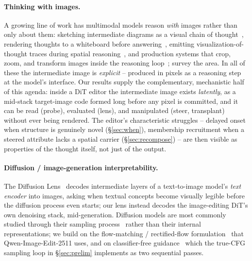 \documentclass[10pt,twocolumn]{article}
\newcommand{\model}{Qwen-Image-Edit-2511}
\begin{document}
\paragraph{Thinking with images.} A growing line of work has multimodal
models reason \emph{with} images rather than only about them: sketching
intermediate diagrams as a visual chain of
thought~\citep{hu2024sketchpad}, rendering thoughts to a whiteboard
before answering~\citep{menon2024whiteboard}, emitting
visualization-of-thought traces during spatial
reasoning~\citep{wu2024vot,li2025mvot}, and production systems that
crop, zoom, and transform images inside the reasoning
loop~\citep{openai2025thinking}; \citet{su2025thinkingsurvey} survey
the area. In all of these the intermediate image is \emph{explicit} --
produced in pixels as a reasoning step at the model's interface. Our
results supply the complementary, mechanistic half of this agenda:
inside a DiT editor the intermediate image exists \emph{latently}, as a
mid-stack target-image code formed long before any pixel is committed,
and it can be read (probe), evaluated (lens), and manipulated (steer,
transplant) without ever being rendered. The editor's characteristic
struggles -- delayed onset when structure is genuinely novel
(\S\ref{sec:when}), membership recruitment when a steered attribute
lacks a spatial carrier (\S\ref{sec:recompose}) -- are then visible as
properties of the thought itself, not just of the output.

\paragraph{Diffusion / image-generation interpretability.} The Diffusion
Lens~\citep{toker2024diffusionlens} decodes intermediate layers of a
text-to-image model's \emph{text encoder} into images, asking when
textual concepts become visually legible before the diffusion process
even starts; our lens instead decodes the image-editing DiT's own
denoising stack, mid-generation. Diffusion models are most commonly
studied through their sampling
process~\citep{ho2020ddpm,song2021ddim,rombach2022ldm} rather than their
internal representations; we build on the flow-matching / rectified-flow
formulation~\citep{lipman2023flowmatching,liu2023rectifiedflow} that
\model{} uses, and on classifier-free
guidance~\citep{ho2022cfg} which the true-CFG sampling loop in
\S\ref{sec:prelim} implements as two sequential passes.
\end{document}
